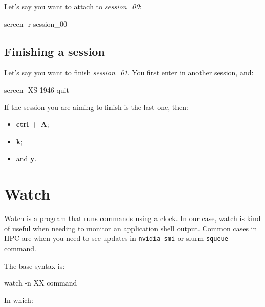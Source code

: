 \documentclass[
]{book}
\newenvironment{Shaded}{\begin{snugshade}}{\end{snugshade}}
\newcommand{\AttributeTok}[1]{\textcolor[rgb]{0.77,0.63,0.00}{#1}}
\newcommand{\ExtensionTok}[1]{#1}
\newcommand{\NormalTok}[1]{#1}
\providecommand{\tightlist}{%
  \setlength{\itemsep}{0pt}\setlength{\parskip}{0pt}}
\begin{document}
Let's say you want to attach to \emph{session\_00}:

\begin{Shaded}
\begin{Highlighting}[]
\ExtensionTok{screen} \AttributeTok{{-}r}\NormalTok{ session\_00}
\end{Highlighting}
\end{Shaded}

\hypertarget{finishing-a-session}{%
\subsection{Finishing a session}\label{finishing-a-session}}

Let's say you want to finish \emph{session\_01}. You first enter in another session, and:

\begin{Shaded}
\begin{Highlighting}[]
\ExtensionTok{screen} \AttributeTok{{-}XS}\NormalTok{ 1946 quit}
\end{Highlighting}
\end{Shaded}

If the session you are aiming to finish is the last one, then:

\begin{itemize}
\tightlist
\item
  \textbf{ctrl + A};
\item
  \textbf{k};
\item
  and \textbf{y}.
\end{itemize}

\hypertarget{watch}{%
\section{Watch}\label{watch}}

Watch is a program that runs commands using a clock. In our case, watch is kind
of useful when needing to monitor an application shell output. Common cases in HPC
are when you need to see updates in \texttt{nvidia-smi} or slurm \texttt{squeue} command.

The base syntax is:

\begin{Shaded}
\begin{Highlighting}[]
\ExtensionTok{watch} \AttributeTok{{-}n}\NormalTok{ XX command}
\end{Highlighting}
\end{Shaded}

In which:
\end{document}
